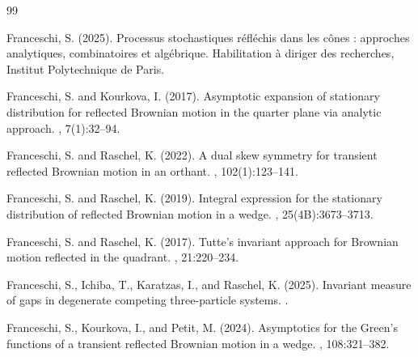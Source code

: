 \documentclass[11pt]{article}
\theoremstyle{definition}
\begin{document}
\begin{thebibliography}{99}

Franceschi, S. (2025).
\newblock Processus stochastiques réfléchis dans les cônes :
approches analytiques, combinatoires et algébrique.
\newblock Habilitation à diriger des recherches, Institut Polytechnique de Paris.

Franceschi, S. and Kourkova, I. (2017).
\newblock Asymptotic expansion of stationary distribution for reflected Brownian motion in the quarter plane via analytic approach.
, 7(1):32--94.

Franceschi, S. and Raschel, K. (2022).
\newblock A dual skew symmetry for transient reflected Brownian motion in an orthant.
, 102(1):123--141.

Franceschi, S. and Raschel, K. (2019).
\newblock Integral expression for the stationary distribution of reflected Brownian motion in a wedge.
, 25(4B):3673--3713.

Franceschi, S. and Raschel, K. (2017).
\newblock Tutte's invariant approach for Brownian motion reflected in the quadrant.
, 21:220--234.

Franceschi, S., Ichiba, T., Karatzas, I., and Raschel, K. (2025).
\newblock Invariant measure of gaps in degenerate competing three-particle systems.
.

Franceschi, S., Kourkova, I., and Petit, M. (2024).
\newblock Asymptotics for the Green’s functions of a transient reflected Brownian motion in a wedge.
, 108:321--382.



\end{thebibliography}
\end{document}
